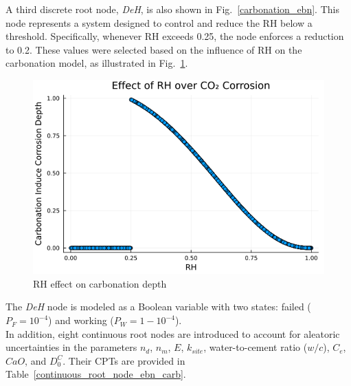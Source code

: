 A third discrete root node, \textit{DeH}, is also shown in Fig.~\ref{carbonation_ebn}. This node represents a system designed to control and reduce the RH below a threshold. Specifically, whenever RH exceeds 0.25, the node enforces a reduction to 0.2. These values were selected based on the influence of RH on the carbonation model, as illustrated in Fig.~\ref{carbonation_depth vs RH}.
\begin{figure}[H]
    \centering
    \includegraphics[width=\linewidth]{imgs/4_case_study/1_RH_vs_CO2corr.png}
    \caption{RH effect on carbonation depth}\label{carbonation_depth vs RH}
\end{figure}
The \textit{DeH} node is modeled as a Boolean variable with two states: failed ($P_{F} = 10^{-4}$) and working ($P_{W} = 1 - 10^{-4}$). \\
In addition, eight continuous root nodes are introduced to account for aleatoric uncertainties in the parameters $n_d$, $n_m$, $E$, $k_{site}$, water-to-cement ratio ($w/c$), $C_e$, $CaO$, and $D_0^C$. Their CPTs are provided in Table~\ref{continuous_root_node_ebn_carb}.
